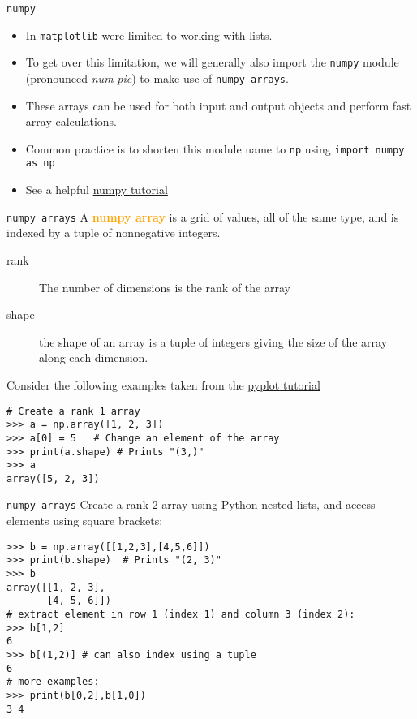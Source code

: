 \documentclass[xcolor=svgnames, colorlinks, handout]{beamer}
\newcommand{\define}[1]{\textbf{\textcolor{orange}{#1}}}
\begin{document}
\begin{frame}[fragile]{\tt numpy}
\begin{itemize}
\item In {\tt matplotlib} were limited to working with lists.\vfill
\item To get over this limitation, we will generally also import the {\tt numpy} module (pronounced \textit{num}-\textit{pie}) to make use of {\tt numpy arrays}.
\vfill
\item These arrays can be used for both input and output objects and perform fast array calculations.
\vfill
\item Common practice is to shorten this module name to {\tt np} using \verb|import numpy as np|
\vfill
\item See a helpful \href{http://cs231n.github.io/python-numpy-tutorial/}{numpy tutorial}
\vfill
\end{itemize}

\end{frame}

\begin{frame}[fragile]{\tt numpy arrays}
 A \define{numpy array} is a grid of values, all of the same type, and is indexed by a tuple of nonnegative integers. 
\begin{description}
\item[rank] The number of dimensions is the rank of the array
\item[shape] the shape of an array is a tuple of integers giving the size of the array along each dimension.
\end{description}
Consider the following examples taken from  the \href{https://matplotlib.org/3.1.0/tutorials/introductory/pyplot.html}{pyplot tutorial}
\begin{Verbatim}[frame=single]
# Create a rank 1 array
>>> a = np.array([1, 2, 3])   
>>> a[0] = 5   # Change an element of the array
>>> print(a.shape) # Prints "(3,)"
>>> a
array([5, 2, 3])
\end{Verbatim}
\end{frame}


\begin{frame}[fragile]{\tt numpy arrays}
Create a rank 2 array using Python nested lists, and access elements using square brackets:
\begin{Verbatim}[frame=single]
>>> b = np.array([[1,2,3],[4,5,6]])    
>>> print(b.shape)  # Prints "(2, 3)"
>>> b
array([[1, 2, 3],
       [4, 5, 6]])
# extract element in row 1 (index 1) and column 3 (index 2):
>>> b[1,2]
6
>>> b[(1,2)] # can also index using a tuple
6
# more examples:
>>> print(b[0,2],b[1,0])
3 4
\end{Verbatim}
\end{frame}
\end{document}
